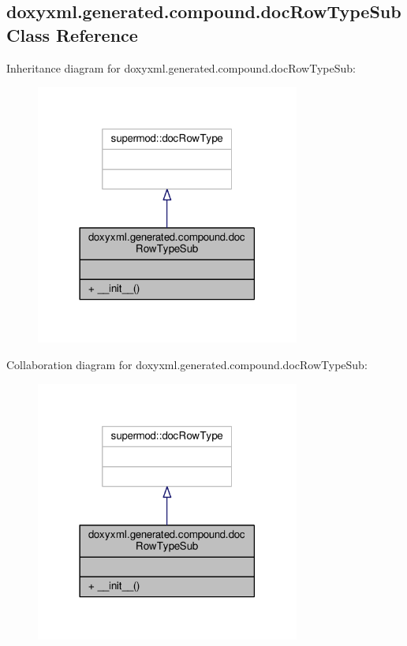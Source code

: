 \subsection{doxyxml.\+generated.\+compound.\+doc\+Row\+Type\+Sub Class Reference}
\label{classdoxyxml_1_1generated_1_1compound_1_1docRowTypeSub}


Inheritance diagram for doxyxml.\+generated.\+compound.\+doc\+Row\+Type\+Sub\+:
\nopagebreak
\begin{figure}[H]
\begin{center}
\leavevmode
\includegraphics[width=246pt]{da/d0e/classdoxyxml_1_1generated_1_1compound_1_1docRowTypeSub__inherit__graph}
\end{center}
\end{figure}


Collaboration diagram for doxyxml.\+generated.\+compound.\+doc\+Row\+Type\+Sub\+:
\nopagebreak
\begin{figure}[H]
\begin{center}
\leavevmode
\includegraphics[width=246pt]{d9/da9/classdoxyxml_1_1generated_1_1compound_1_1docRowTypeSub__coll__graph}
\end{center}
\end{figure}
